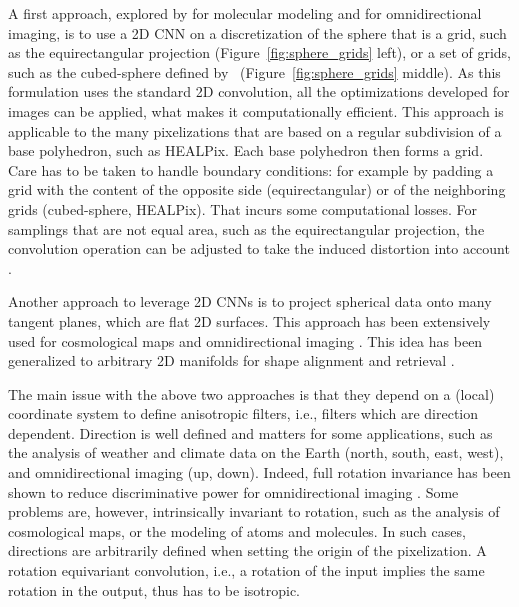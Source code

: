 \documentclass[final,twocolumn,3p,times,authoryear]{elsarticle}
\newcommand{\figref}[1]{Figure~\ref{fig:#1}}
\newcommand{\1}{\b{1}}              %
\newcommand{\0}{\b{0}}              %
\begin{document}
A first approach, explored by \citet{boomsma2017spherical} for molecular modeling and \citet{su2017sphericalconv, coors2018spherenet} for omnidirectional imaging, is to use a 2D CNN on a discretization of the sphere that is a grid, such as the equirectangular projection (\figref{sphere_grids} left), or a set of grids, such as the cubed-sphere defined by~\citet{ronchi1996cubed} (\figref{sphere_grids} middle).
As this formulation uses the standard 2D convolution, all the optimizations developed for images can be applied, what makes it computationally efficient.
This approach is applicable to the many pixelizations that are based on a regular subdivision of a base polyhedron, such as HEALPix. Each base polyhedron then forms a grid.
Care has to be taken to handle boundary conditions: for example by padding a grid with the content of the opposite side (equirectangular) or of the neighboring grids (cubed-sphere, HEALPix). That incurs some computational losses.
For samplings that are not equal area, such as the equirectangular projection, the convolution operation can be adjusted to take the induced distortion into account \citep{su2017sphericalconv, coors2018spherenet}.

Another approach to leverage 2D CNNs is to project spherical data onto many tangent planes, which are flat 2D surfaces. This approach has been extensively used for cosmological maps \citep{fluri2018deep, gupta2018nongaussianinformation, schmelze2017cosmologicalmodel, gillet2018deeplearning} and omnidirectional imaging \citep{xiao2012recognizing, zhang2014panocontext}. This idea has been generalized to arbitrary 2D manifolds for shape alignment and retrieval \citep{masci2015gcnn, boscaini2016acnn, monti2017monet}.

The main issue with the above two approaches is that they depend on a (local) coordinate system to define anisotropic filters, i.e., filters which are direction dependent. Direction is well defined and matters for some applications, such as the analysis of weather and climate data on the Earth (north, south, east, west), and omnidirectional imaging (up, down). Indeed, full rotation invariance has been shown to reduce discriminative power for omnidirectional imaging \citep{coors2018spherenet}. Some problems are, however, intrinsically invariant to rotation, such as the analysis of cosmological maps, or the modeling of atoms and molecules. In such cases, directions are arbitrarily defined when setting the origin of the pixelization. A rotation equivariant convolution, i.e., a rotation of the input implies the same rotation in the output, thus has to be isotropic.
\end{document}
